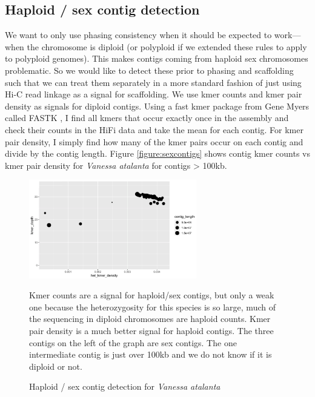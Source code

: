 {\subsection{Haploid / sex contig detection}

\par{
We want to only use phasing consistency when it should be expected to work---when the chromosome is diploid (or polyploid if we extended these rules to apply to polyploid genomes). This makes contigs coming from haploid sex chromosomes problematic. So we would like to detect these prior to phasing and scaffolding such that we can treat them separately in a more standard fashion of just using Hi-C read linkage as a signal for scaffolding. We use kmer counts and kmer pair density as signals for diploid contigs. Using a fast kmer package from Gene Myers called FASTK \cite{fastk}, I find all kmers that occur exactly once in the assembly and check their counts in the HiFi data and take the mean for each contig. For kmer pair density, I simply find how many of the kmer pairs occur on each contig and divide by the contig length. Figure \ref{figure:sexcontigs} shows contig kmer counts vs kmer pair density for \textit{Vanessa atalanta} for contigs > 100kb.
}

\begin{figure}[htbp!]
\caption{Haploid / sex contig detection for \textit{Vanessa atalanta}}
\label{figure:sexcontig}
\begin{centering}
\includegraphics[width=0.65\textwidth]{sexcontig.png}
\par{Kmer counts are a signal for haploid/sex contigs, but only a weak one because the heterozygosity for this species is so large, much of the sequencing in diploid chromosomes are haploid counts. Kmer pair density is a much better signal for haploid contigs. The three contigs on the left of the graph are sex contigs. The one intermediate contig is just over 100kb and we do not know if it is diploid or not. }
\end{centering}
\end{figure}

}
